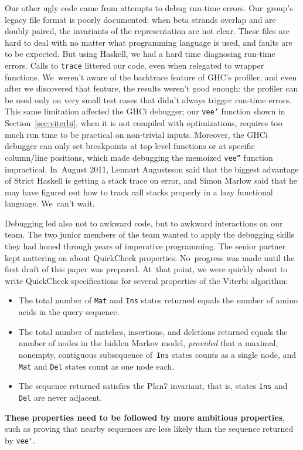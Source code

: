 \documentclass[preprint,nonatbib,blockstyle,nocopyrightspace,times]{sigplanconf}
\newcommand\secref[1]{Section~\ref{sec:#1}}
\begin{document}
Our other ugly code came from  attempts to debug
run-time errors.
Our~group's legacy file
format is poorly documented: when beta
strands overlap and are doubly paired, the invariants of the
representation are not clear.
These files are hard to deal with no matter what
programming language is used, and faults are to be expected.
But using Haskell, we had a hard time diagnosing run-time errors.
Calls to
\texttt{trace} 
littered our code,
even when relegated to wrapper functions.
We~weren't aware of the backtrace feature of GHC's profiler,
and even after we discovered that feature, the results weren't good enough:
the profiler can be used only on very small test cases that didn't always trigger
run-time errors.
This same limitation affected the GHCi debugger; our \texttt{vee'} function
shown in \secref{viterbi}, when it is not compiled with
optimizations, requires too much run time to be practical on non-trivial
inputs.
Moreover, the GHCi debugger can only set breakpoints at top-level functions
or at specific column/line positions, which made debugging the memoized
\texttt{vee''} function impractical.
In~August 2011, 
Lennart Augustsson said that the biggest advantage of Strict
Haskell is getting a stack trace on error,
and Simon Marlow said that he may have figured out how to track call
stacks properly in a lazy functional language.
We~can't wait.


Debugging led also not to awkward code, but to awkward interactions on
our team.
The two junior members of the team wanted to apply the debugging
skills they had honed through years of imperative programming.
The senior partner kept nattering on about QuickCheck properties.
No~progress was made until the first draft of this paper was prepared.
At~that point, we were quickly about to write QuickCheck
specifications for several properties of the Viterbi algorithm:
\begin{itemize}
\item
The total number of \verb+Mat+ and \verb+Ins+ states returned equals
the number of amino acids in the query sequence.
\item
The total number of matches, insertions, and deletions returned equals the
number of nodes in the hidden Markov model,
\emph{provided} that a maximal, nonempty, contiguous subsequence
of~\verb+Ins+ states counts as a single node,
and \verb+Mat+ and \verb+Del+ states count as one node each.
\item
The sequence returned satisfies the Plan7 invariant, that is, states
\verb+Ins+ and \verb+Del+ are never adjacent.
\end{itemize}
\textbf{These properties need to be followed by more ambitious
properties},
such as proving that nearby sequences are less likely than the
sequence returned by \verb+vee'+.
\end{document}
